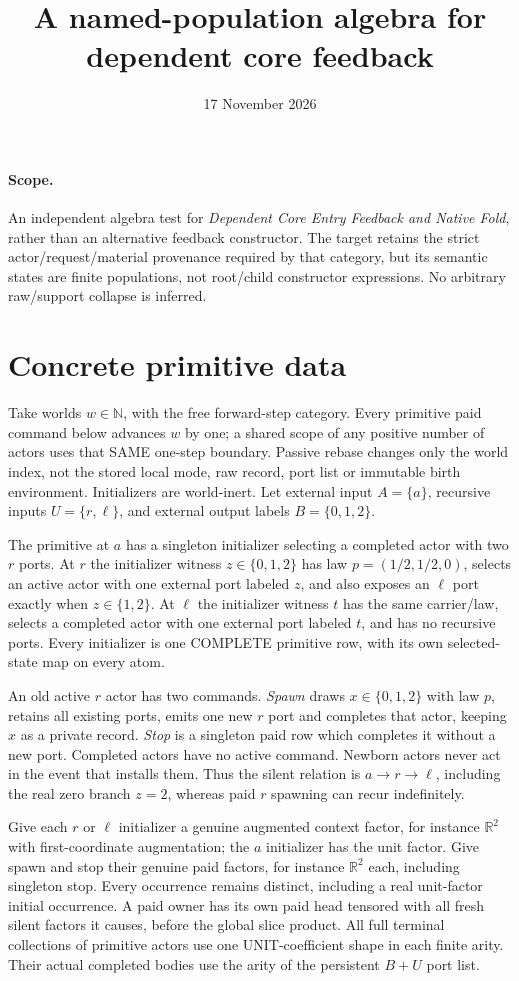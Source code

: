\documentclass[11pt]{article}
\title{A named-population algebra for dependent core feedback}
\date{17 November 2026}
\begin{document}
\maketitle
\paragraph{Scope.} An independent algebra test for \emph{Dependent Core Entry Feedback and Native Fold}, rather than an alternative feedback constructor. The target retains the strict actor/request/material provenance required by that category, but its semantic states are finite populations, not root/child constructor expressions. No arbitrary raw/support collapse is inferred.

\section{Concrete primitive data}
Take worlds $w\in\mathbb N$, with the free forward-step category. Every primitive paid command below advances $w$ by one; a shared scope of any positive number of actors uses that SAME one-step boundary. Passive rebase changes only the world index, not the stored local mode, raw record, port list or immutable birth environment. Initializers are world-inert. Let external input $A=\{a\}$, recursive inputs $U=\{r,\ell\}$, and external output labels $B=\{0,1,2\}$.

The primitive at $a$ has a singleton initializer selecting a completed actor with two $r$ ports. At $r$ the initializer witness $z\in\{0,1,2\}$ has law $p=(1/2,1/2,0)$, selects an active actor with one external port labeled $z$, and also exposes an $\ell$ port exactly when $z\in\{1,2\}$. At $\ell$ the initializer witness $t$ has the same carrier/law, selects a completed actor with one external port labeled $t$, and has no recursive ports. Every initializer is one COMPLETE primitive row, with its own selected-state map on every atom.

An old active $r$ actor has two commands. \emph{Spawn} draws $x\in\{0,1,2\}$ with law $p$, retains all existing ports, emits one new $r$ port and completes that actor, keeping $x$ as a private record. \emph{Stop} is a singleton paid row which completes it without a new port. Completed actors have no active command. Newborn actors never act in the event that installs them. Thus the silent relation is $a\to r\to\ell$, including the real zero branch $z=2$, whereas paid $r$ spawning can recur indefinitely.

Give each $r$ or $\ell$ initializer a genuine augmented context factor, for instance $\mathbb R^2$ with first-coordinate augmentation; the $a$ initializer has the unit factor. Give spawn and stop their genuine paid factors, for instance $\mathbb R^2$ each, including singleton stop. Every occurrence remains distinct, including a real unit-factor initial occurrence. A paid owner has its own paid head tensored with all fresh silent factors it causes, before the global slice product. All full terminal collections of primitive actors use one UNIT-coefficient shape in each finite arity. Their actual completed bodies use the arity of the persistent $B+U$ port list.
\end{document}
